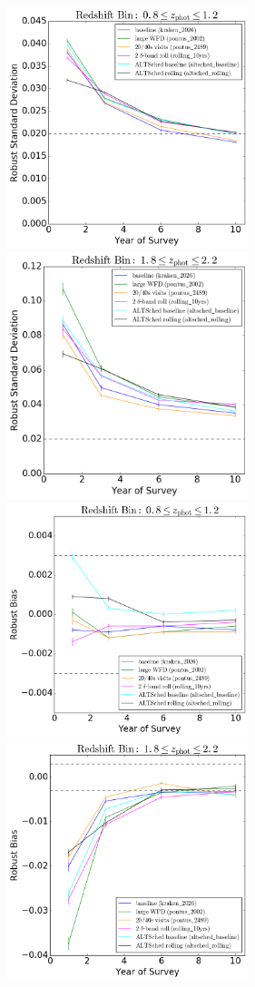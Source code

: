 \begin{figure}
\begin{center}
\includegraphics[width=7cm,trim={0cm 0cm 0cm 0cm},clip]{figures/zbin1_IQRs.png}
\includegraphics[width=7cm,trim={0cm 0cm 0cm 0cm},clip]{figures/zbin2_IQRs.png}
\includegraphics[width=7cm,trim={0cm 0cm 0cm 0cm},clip]{figures/zbin1_bias.png}
\includegraphics[width=7cm,trim={0cm 0cm 0cm 0cm},clip]{figures/zbin2_bias.png}

\end{center}
\end{figure}
